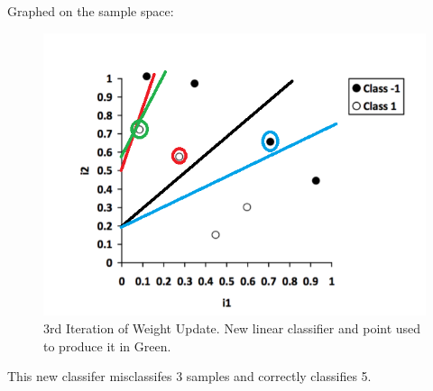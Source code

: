 \documentclass[12pt]{article}
\begin{document}
Graphed on the sample space: \\
\begin{figure}[H]
    \centering
    \includegraphics[width=1\textwidth]{question_4_plot_a_it3}
    \caption{3rd Iteration of Weight Update. New linear classifier and point used to produce it in Green.}
    \label{fig:question_4_plot_a_it3}
\end{figure}
This new classifer misclassifes 3 samples and correctly classifies 5.\\
\end{document}
